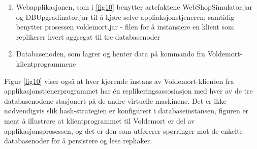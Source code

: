 \begin{enumerate}
  \item Webapplikasjonen, som i \ref{fig10} benytter artefaktene WebShopSimulator.jar og DBUpgradinator.jar til å kjøre selve appliaksjonstjeneren; samtidig benytter prosessen voldemort.jar - filen for å instansiere en klient som replikerer hvert aggregat til tre databasenoder
  \item Databasenoden, som lagrer og henter data på kommando fra Voldemort-klientprogrammene
\end{enumerate}

Figur \ref{fig10} viser også at hver kjørende instans av Voldemort-klienten fra applikasjonstjenerprogrammet har én replikeringsassosiasjon med hver av de tre databasenodene stasjonert på de andre virtuelle maskinene. Det er ikke nødvendigvis slik hash-strategien er konfigurert i databaseinstansen, figuren er ment å illustrere at klientprogrammet til Voldemort er del av applikasjonsprosessen, og det er den som utførerer spørringer mot de enkelte databasenoder for å persistere og lese repliaker.

